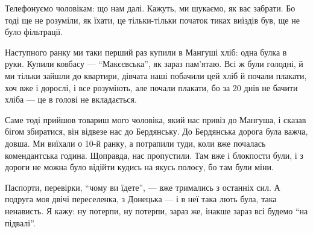 Телефонуємо чоловікам: що нам далі. Кажуть, ми шукаємо, як вас забрати. Бо тоді
ще не розуміли, як їхати, це тільки-тільки початок тиках виїздів був, ще не
було фільтрації.


Наступного ранку ми таки перший раз купили в Мангуші хліб: одна булка в руки.
Купили ковбасу — \enquote{Макєєвська}, як зараз пам'ятаю. Всі ж були голодні, й ми
тільки зайшли до квартири, дівчата наші побачили цей хліб й почали плакати, хоч
вже і дорослі, і все розуміють, але почали плакати, бо за 20 днів не бачити
хліба — це в голові не вкладається.

Саме тоді прийшов товариш мого чоловіка, який нас привіз до Мангуша, і сказав
бігом збиратися, він відвезе нас до Бердянську. До Бердянська дорога була
важча, довша. Ми виїхали о 10-й ранку, а потрапили туди, коли вже почалась
комендантська година. Щоправда, нас пропустили. Там вже і блокпости були, і з
дороги не можна було відійти кудись на якусь полосу, бо там були міни.

\begin{qqquote}
Паспорти, перевірки, \enquote{чому ви їдете}, — вже тримались з останніх сил. А подруга
моя двічі переселенка, з Донецька — і в неї така лють була, така ненависть. Я
кажу: ну потерпи, ну потерпи, зараз же, інакше зараз всі будемо \enquote{на підвалі}.	
\end{qqquote}

